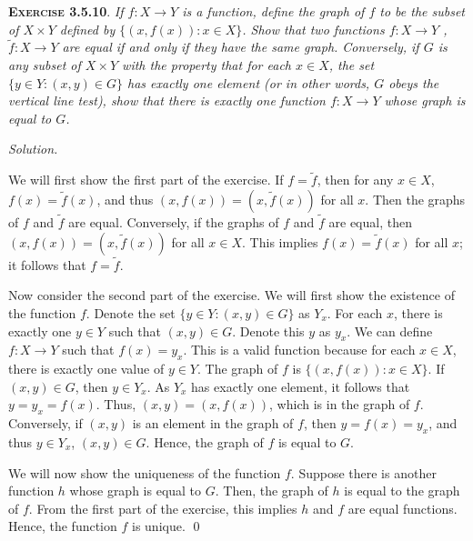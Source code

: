 \documentclass[12pt]{article}
\theoremstyle{remark}
\newenvironment{exer}[2]{
    \noindent \setlength{\parskip}{1em}%
    \textsc{\textbf{Exercise #1}}. \textit{#2} \par
    \noindent \textit{Solution.} %
}{\bigskip}
\begin{document}
\begin{exer}{3.5.10}{
    If $f : X \to Y$ is a function, define the \emph{graph} of $f$ to be the subset of $X \times Y$ defined by $\{(x, f(x)) : x \in X\}$.
    Show that two functions $f : X \to Y$ , $\tilde{f} : X \to Y$ are equal if and only if they have the same graph.
    Conversely, if $G$ is any subset of $X \times Y$ with the property that for each $x \in X$, the set $\{y \in Y : (x, y) \in G \}$ has exactly one element (or in other words, $G$ obeys the \emph{vertical line test}), show that there is exactly one function $f : X \to Y$ whose graph is equal to $G$.
}
    We will first show the first part of the exercise.
    If $f = \tilde{f}$, then for any $x \in X$, $f(x) = \tilde{f}(x)$, and thus $(x, f(x)) = (x, \tilde{f}(x))$ for all $x$.
    Then the graphs of $f$ and $\tilde{f}$ are equal.
    Conversely, if the graphs of $f$ and $\tilde{f}$ are equal, then $(x, f(x)) = (x, \tilde{f}(x))$ for all $x \in X$.
    This implies $f(x) = \tilde{f}(x)$ for all $x$; it follows that $f = \tilde{f}$.

    Now consider the second part of the exercise.
    We will first show the existence of the function $f$.
    Denote the set $\{y \in Y : (x, y) \in G \}$ as $Y_x$.
    For each $x$, there is exactly one $y \in Y$ such that $(x, y) \in G$.
    Denote this $y$ as $y_x$.
    We can define $f : X \to Y$ such that $f(x) = y_x$.
    This is a valid function because for each $x \in X$, there is exactly one value of $y \in Y$.
    The graph of $f$ is $\{(x, f(x)) : x \in X \}$.
    If $(x, y) \in G$, then $y \in Y_x$. As $Y_x$ has exactly one element, it follows that $y = y_x = f(x)$.
    Thus, $(x, y) = (x, f(x))$, which is in the graph of $f$.
    Conversely, if $(x, y)$ is an element in the graph of $f$, then $y = f(x) = y_x$, and thus $y \in Y_x$, $(x, y) \in G$.
    Hence, the graph of $f$ is equal to $G$.

    We will now show the uniqueness of the function $f$.
    Suppose there is another function $h$ whose graph is equal to $G$.
    Then, the graph of $h$ is equal to the graph of $f$.
    From the first part of the exercise, this implies $h$ and $f$ are equal functions.
    Hence, the function $f$ is unique. \qed    
\end{exer}
\end{document}
